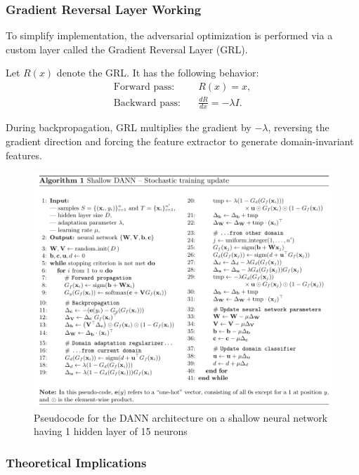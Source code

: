 \documentclass{article}
\begin{document}
\subsubsection{Gradient Reversal Layer Working}

To simplify implementation, the adversarial optimization is performed via a custom layer called the Gradient Reversal Layer (GRL).


Let \( R(x) \) denote the GRL. It has the following behavior:
\begin{align}
\text{Forward pass:} \quad &R(x) = x, \\
\text{Backward pass:} \quad &\frac{dR}{dx} = -\lambda I.
\end{align}

During backpropagation, GRL multiplies the gradient by \(-\lambda\), reversing the gradient direction and forcing the feature extractor to generate domain-invariant features.

\begin{figure}[H]
    \centering
    \includegraphics[width=1\linewidth]{images/DANN/ALGO.png}
    \caption{Pseudocode for the DANN architecture on a shallow neural network having 1 hidden layer of 15 neurons}
    \label{fig:enter-label}
\end{figure}

\subsubsection{Theoretical Implications}
\end{document}

